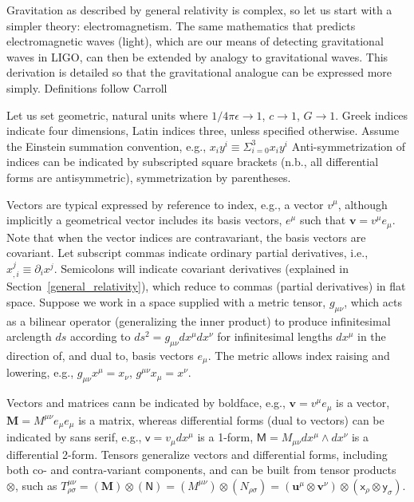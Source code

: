     
    Gravitation as described by general relativity is complex, so let us start with a simpler theory: electromagnetism. 
The same mathematics that predicts electromagnetic waves (light), which are our means of detecting gravitational waves in LIGO, can then be extended by analogy to gravitational waves.
This derivation is detailed so that the gravitational analogue can be expressed more simply.
Definitions follow Carroll~\cite{Carroll1997}

    Let us set geometric, natural units where $1/4\pi\epsilon \rightarrow 1$, $c \rightarrow 1$, $G \rightarrow 1$. 
Greek indices indicate four dimensions, Latin indices three, unless specified otherwise.
Assume the Einstein summation convention, e.g., $x_i y^i \equiv \Sigma_{i=0}^3 x_i y^i$
Anti-symmetrization of indices can be indicated by subscripted square brackets (n.b., all differential forms are antisymmetric), symmetrization by parentheses.

Vectors are typical expressed by reference to index, e.g., a vector $v^\mu$, although implicitly a geometrical vector includes its basis vectors, $e^\mu$ such that $\textbf{v} = v^\mu e_\mu$.
Note that when the vector indices are contravariant, the basis vectors are covariant.
Let subscript commas indicate ordinary partial derivatives, i.e., $x_{,i}^j \equiv \partial_i x^j$.
Semicolons will indicate covariant derivatives (explained in Section~\ref{general_relativity}), which reduce to commas (partial derivatives) in flat space. 
Suppose we work in a space supplied with a metric tensor, $g_{\mu\nu}$, which acts as a bilinear operator (generalizing the inner product) to produce infinitesimal arclength $ds$ according to $ds^2 = g_{\mu \nu} dx^\mu dx^\nu$ for infinitesimal lengths $dx^\mu$ in the direction of, and dual to, basis vectors $e_\mu$. 
The metric allows index raising and lowering, e.g., $g_{\mu \nu} x^\mu = x_\nu$, $g^{\mu \nu} x_\mu = x^\nu$.

Vectors and matrices cann be indicated by boldface, e.g., $\textbf{v} = v^\mu e_\mu$ is a vector, $\textbf{M} = M^{\mu\nu} e_\mu e_\mu $ is a matrix, whereas differential forms (dual to vectors) can be indicated by sans serif, e.g., $\textsf{v} = v_\mu dx^\mu$ is a 1-form, $\textsf{M} = M_{\mu\nu} dx^\mu \wedge dx^\nu$ is a differential 2-form.
Tensors generalize vectors and differential forms, including both co- and contra-variant components, and can be built from tensor products $\otimes$, such as $T^{\mu\nu}_{\rho\sigma} = (\textbf{M})\otimes (\textsf{N}) = (M^{\mu\nu}) \otimes (N_{\rho\sigma})= (\textbf{u}^\mu \otimes \textbf{v}^\nu) \otimes (\textsf{x}_\rho \otimes \textsf{y}_\sigma)$.

